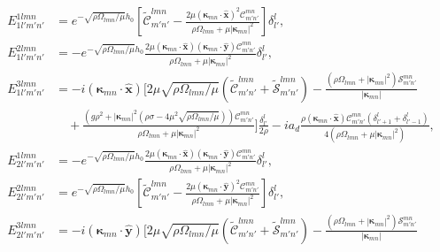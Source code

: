 \documentclass[aps,pre,amsmath,amssymb,floatfix,onecolumn,notitlepage,10pt]{revtex4-1}
\begin{document}
\begin{align}
E_{1l'm'n'}^{1lmn} &= e^ {-\sqrt{{\rho  \Omega _{l m n}}/{\mu }}h_0}\left[ \tilde{\mathcal{C}}_{m' n'}^{l m n}-\frac{2 \mu  \left( \bm{\kappa}_{mn}\cdot\hat{\mathbf{x}} \right)^2 \mathcal{C}_{m' n'}^{m n}}{\rho  \Omega _{l m n}+\mu  \left\lvert \bm{\kappa}_{m n} \right\rvert^2}\right] \delta^l_{l'}, \\
E_{1l'm'n'}^{2lmn} &=-e^ {-\sqrt{{\rho  \Omega _{l m n}}/{\mu }}h_0}\frac{2 \mu  \left( \bm{\kappa}_{mn}\cdot\hat{\mathbf{x}} \right) \left( \bm{\kappa}_{mn}\cdot\hat{\mathbf{y}} \right) \mathcal{C}_{m' n'}^{m n}}{\rho  \Omega _{l m n}+\mu  \left\lvert \bm{\kappa}_{m n} \right\rvert^2} \delta^l_{l'},  \\
E_{1l'm'n'}^{3lmn} &=-i \left( \bm{\kappa}_{mn}\cdot\hat{\mathbf{x}} \right) \Bigg[2 \mu  \sqrt{{\rho  \Omega _{l m n}}/{\mu }} \left(\tilde{\mathcal{C}}_{m' n'}^{l m n}+\tilde{\mathcal{S}}_{m' n'}^{l m n}\right)-\frac{\left( \rho  \Omega _{l m n} +  \left\lvert \bm{\kappa}_{m n} \right\rvert^2 \right) \mathcal{S}_{m' n'}^{m n}}{\left\lvert \bm{\kappa}_{m n} \right\rvert} \nonumber \\
&\quad + \frac{\left(g \rho ^2+\left\lvert \bm{\kappa}_{m n} \right\rvert^2 \left(\rho  \sigma -4 \mu ^2 \sqrt{{\rho  \Omega _{l m n}}/{\mu }}\right)\right)\mathcal{C}_{m' n'}^{m n}}{\rho  \Omega _{l m n}+\mu  \left\lvert \bm{\kappa}_{m n} \right\rvert^2}\Bigg] \frac{\delta^l_{l'}}{2\rho} - i a_d \frac{\rho\left( \bm{\kappa}_{mn}\cdot\hat{\mathbf{x}} \right) \mathcal{C}_{m' n'}^{m n} \left(\delta^l_{l'+1}+\delta^l_{l'-1}\right)}{4\left(\rho  \Omega _{l m n}+\mu  \left\lvert \bm{\kappa}_{m n} \right\rvert^2\right)},  \\
E_{2l'm'n'}^{1lmn} &= -e^ {-\sqrt{{\rho  \Omega _{l m n}}/{\mu }}h_0}\frac{2 \mu  \left( \bm{\kappa}_{mn}\cdot\hat{\mathbf{x}} \right) \left( \bm{\kappa}_{mn}\cdot\hat{\mathbf{y}} \right) \mathcal{C}_{m' n'}^{m n}}{\rho  \Omega _{l m n}+\mu  \left\lvert \bm{\kappa}_{m n} \right\rvert^2} \delta^l_{l'}, \\
E_{2l'm'n'}^{2lmn} &=e^ {-\sqrt{{\rho  \Omega _{l m n}}/{\mu }}h_0}\left[\tilde{\mathcal{C}}_{m' n'}^{l m n}-\frac{2 \mu  \left( \bm{\kappa}_{mn}\cdot\hat{\mathbf{y}} \right)^2 \mathcal{C}_{m' n'}^{m n}}{\rho  \Omega _{l m n}+\mu  \left\lvert \bm{\kappa}_{m n} \right\rvert^2}\right] \delta^l_{l'}, \\
E_{2l'm'n'}^{3lmn} &= -i \left( \bm{\kappa}_{mn}\cdot\hat{\mathbf{y}} \right)  \Bigg[2 \mu  \sqrt{{\rho  \Omega _{l m n}}/{\mu }} \left(\tilde{\mathcal{C}}_{m' n'}^{l m n}+\tilde{\mathcal{S}}_{m' n'}^{l m n}\right)-\frac{\left( \rho  \Omega _{l m n} +  \left\lvert \bm{\kappa}_{m n} \right\rvert^2 \right) \mathcal{S}_{m' n'}^{m n}}{\left\lvert \bm{\kappa}_{m n} \right\rvert} \nonumber \\

\end{align}
\end{document}
